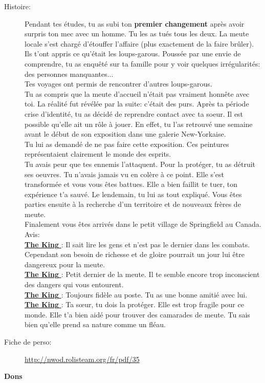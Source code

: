 \documentclass[oneside,12pt]{book}
\newcommand{\King}{\textbf{The King} }
\begin{document}
\begin{flushleft}
\begin{description}
\item[Histoire:]{ 
Pendant tes études, tu as subi ton \textbf{premier changement} après avoir surpris ton mec avec un homme. Tu les as tués tous les deux.
La meute locale s'est chargé d'étouffer l'affaire (plus exactement de la faire brûler).\\
Ils t'ont appris ce qu'était les loups-garous. Poussée par une envie de comprendre, tu as enquêté sur ta famille pour y voir quelques irrégularités: des personnes manquantes...\\
Tes voyages ont permis de rencontrer d'autres loups-garous.\\
Tu as compris que la meute d'accueil n'était pas vraiment honnête avec toi. La réalité fut révélée par la suite: c'était des purs.
Après ta période crise d'identité, tu as décidé de reprendre contact avec ta soeur. Il est possible qu'elle ait un rôle à jouer.
En effet, tu l'as retrouvé une semaine avant le début de son exposition dans une galerie New-Yorkaise.\\
Tu lui as demandé de ne pas faire cette exposition. Ces peintures représentaient clairement le monde des esprits.\\
Tu avais peur que tes ennemis l'attaquent. Pour la protéger, tu as détruit ses oeuvres. Tu n'avais jamais vu en colère à ce point.
Elle s'est transformée et vous vous êtes battues. Elle a bien faillit te tuer, ton expérience t'a sauvé. Le lendemain, tu lui as tout expliqué.
Vous êtes parties ensuite à la recherche d'un territoire et de nouveaux frères de meute.\\
Finalement vous êtes arrivés dans le petit village de Springfield au Canada.  \\
Avis:\\
\underline{\King} : Il sait lire les gens et n'est pas le dernier dans les combats. Cependant son besoin de richesse et de gloire pourrait un jour lui être dangereux pour la meute. \\
\underline{\King} : Petit dernier de la meute. Il te semble encore trop inconscient des dangers qui vous entourent.\\
\underline{\King} : Toujours fidèle au poste. Tu as une bonne amitié avec lui.\\
\underline{\King}: Ta sœur, tu dois la protéger. Elle est trop fragile pour ce monde. Elle t'a bien aidé pour trouver des camarades de meute. Tu sais bien qu'elle prend sa nature comme un fléau.\\
}
\item[Fiche de perso:]{\href{http://nwod.rolisteam.org/fr/pdf/35}{http://nwod.rolisteam.org/fr/pdf/35}}
\end{description}
\clearpage
\textbf{\large Dons} 
\vspace{0.5cm}


\end{flushleft}
\end{document}
